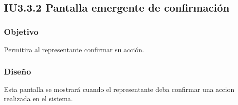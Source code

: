 
\subsection{IU3.3.2 Pantalla emergente de confirmación}

\subsubsection{Objetivo}
	Permitira al representante confirmar su acción.

\subsubsection{Diseño}
	Esta pantalla se mostrará cuando el representante deba confirmar una accion realizada en el sistema.

